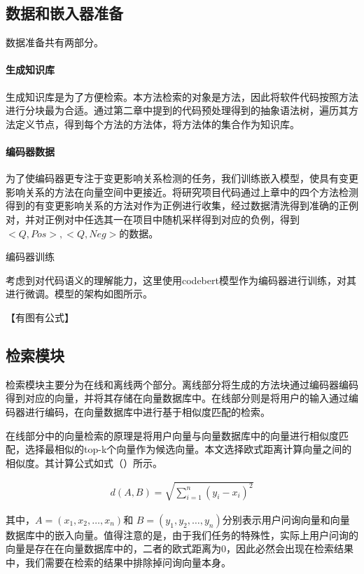 \subsection{数据和嵌入器准备}

数据准备共有两部分。

\paragraph{生成知识库} 生成知识库是为了方便检索。本方法检索的对象是方法，因此将软件代码按照方法进行分块最为合适。通过第二章中提到的代码预处理得到的抽象语法树，遍历其方法定义节点，得到每个方法的方法体，将方法体的集合作为知识库。

\paragraph{编码器数据} 为了使编码器更专注于变更影响关系检测的任务，我们训练嵌入模型，使具有变更影响关系的方法在向量空间中更接近。将研究项目代码通过上章中的四个方法检测得到的有变更影响关系的方法对作为正例进行收集，经过数据清洗得到准确的正例对，并对正例对中任选其一在项目中随机采样得到对应的负例，得到$<Q,Pos>,<Q,Neg>$的数据。


编码器训练

考虑到对代码语义的理解能力，这里使用codebert模型作为编码器进行训练，对其进行微调。模型的架构如图所示。

【有图有公式】


\subsection{检索模块}

检索模块主要分为在线和离线两个部分。离线部分将生成的方法块通过编码器编码得到对应的向量，并将其存储在向量数据库中。在线部分则是将用户的输入通过编码器进行编码，在向量数据库中进行基于相似度匹配的检索。


在线部分中的向量检索的原理是将用户向量与向量数据库中的向量进行相似度匹配，选择最相似的top-k个向量作为候选向量。本文选择欧式距离计算向量之间的相似度。其计算公式如式（）所示。


\begin{align}
d(A, B) = \sqrt{\sum_{i=1}^{n} (y_i - x_i)^2}
\end{align}

其中，$A = (x_1, x_2, \dots, x_n)$和 $ B = (y_1, y_2, \dots, y_n)$分别表示用户问询向量和向量数据库中的嵌入向量。值得注意的是，由于我们任务的特殊性，实际上用户问询的向量是存在在向量数据库中的，二者的欧式距离为0，因此必然会出现在检索结果中，我们需要在检索的结果中排除掉问询向量本身。



